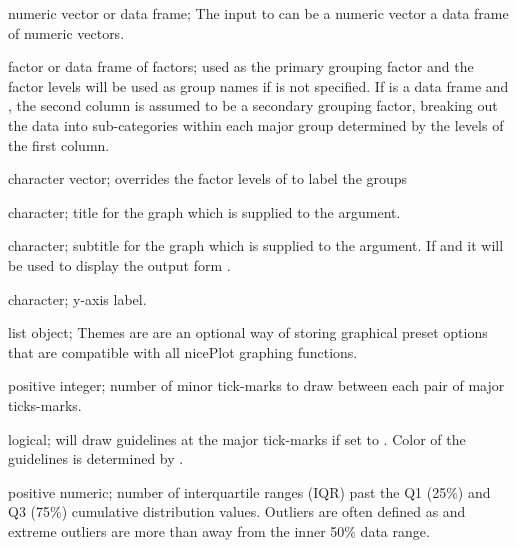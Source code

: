 \documentclass[a4paper]{book}
\begin{document}
\begin{Arguments}
\begin{ldescription}
\item[\code{x}] numeric vector or data frame; The input to  can be a numeric vector a  data frame of numeric vectors.

\item[\code{by}] factor or data frame of factors; used as the primary grouping factor and the factor levels will be used as group names if  is not specified. If  is a data frame and , the second column is assumed to be a secondary grouping factor, breaking out the data into sub-categories within each major group determined by the levels of the first column.

\item[\code{groupNames}] character vector; overrides the factor levels of  to label the groups

\item[\code{main}] character; title for the graph which is supplied to the  argument.

\item[\code{sub}] character; subtitle for the graph which is supplied to the  argument. If  and  it will be used to display the output form .

\item[\code{ylab}] character; y-axis label.

\item[\code{theme}] list object; Themes are are an optional way of storing graphical preset options that are compatible with all nicePlot graphing functions.

\item[\code{minorTick}] positive integer; number of minor tick-marks to draw between each pair of major ticks-marks.

\item[\code{guides}] logical; will draw guidelines at the major tick-marks if set to . Color of the guidelines is determined by .

\item[\code{outliers}] positive numeric; number of interquartile ranges (IQR) past the Q1 (25\%) and Q3 (75\%) cumulative distribution values. Outliers are often defined as  and extreme outliers are more than  away from the inner 50\% data range.


\end{ldescription}
\end{Arguments}
\end{document}
